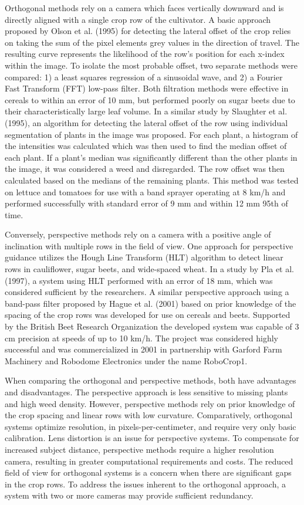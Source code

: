 Orthogonal methods rely on a camera which faces vertically downward
and is directly aligned with a single crop row of the cultivator. A
basic approach proposed by Olson et al. (1995) for detecting the
lateral offset of the crop relies on taking the sum of the pixel
elements grey values in the direction of travel. The resulting curve
represents the likelihood of the row’s position for each x-index
within the image. To isolate the most probable offset, two separate
methods were compared: 1) a least squares regression of a sinusoidal
wave, and 2) a Fourier Fast Transform (FFT) low-pass filter. Both
filtration methods were effective in cereals to within an error of 10
mm, but performed poorly on sugar beets due to their
characteristically large leaf volume. In a similar study by Slaughter
et al. (1995), an algorithm for detecting the lateral offset of the
row using individual segmentation of plants in the image was
proposed. For each plant, a histogram of the intensities was
calculated which was then used to find the median offset of each
plant. If a plant’s median was significantly different than the other
plants in the image, it was considered a weed and disregarded. The row
offset was then calculated based on the medians of the remaining
plants. This method was tested on lettuce and tomatoes for use with a
band sprayer operating at 8 km/h and performed successfully with
standard error of 9 mm and within 12 mm 95th of time.

Conversely, perspective methods rely on a camera with a positive angle
of inclination with multiple rows in the field of view. One approach
for perspective guidance utilizes the Hough Line Transform (HLT)
algorithm to detect linear rows in cauliflower, sugar beets, and
wide-spaced wheat. In a study by Pla et al. (1997), a system using HLT
performed with an error of 18 mm, which was considered sufficient by
the researchers. A similar perspective approach using a band-pass
filter proposed by Hague et al. (2001) based on prior knowledge of the
spacing of the crop rows was developed for use on cereals and
beets. Supported by the British Beet Research Organization the
developed system was capable of 3 cm precision at speeds of up to 10
km/h. The project was considered highly successful and was
commercialized in 2001 in partnership with Garford Farm Machinery and
Robodome Electronics under the name RoboCrop1.

When comparing the orthogonal and perspective methods, both have
advantages and disadvantages. The perspective approach is less
sensitive to missing plants and high weed density. However,
perspective methods rely on prior knowledge of the crop spacing and
linear rows with low curvature. Comparatively, orthogonal systems
optimize resolution, in pixels-per-centimeter, and require very only
basic calibration. Lens distortion is an issue for perspective
systems. To compensate for increased subject distance, perspective
methods require a higher resolution camera, resulting in greater
computational requirements and costs. The reduced field of view for
orthogonal systems is a concern when there are significant gaps in the
crop rows. To address the issues inherent to the orthogonal approach,
a system with two or more cameras may provide sufficient redundancy.

